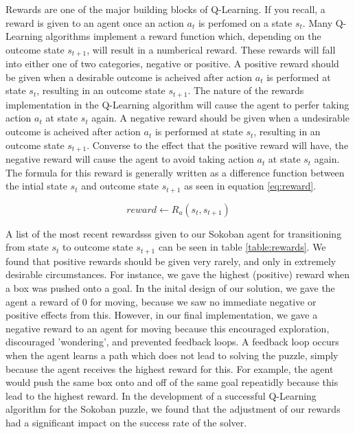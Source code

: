 \documentclass[times, 10pt,twocolumn]{article}
\begin{document}

Rewards are one of the major building blocks of Q-Learning.  If you recall, a reward is given to an agent once an action $a_t$ is perfomed on a state $s_t$.  Many Q-Learning algorithms implement a reward function which, depending on the outcome state $s_{t+1}$, will result in a numberical reward.  These rewards will fall into either one of two categories, negative or positive.  A positive reward should be given when a desirable outcome is acheived after action $a_t$ is performed at state $s_t$, resulting in an outcome state $s_{t+1}$.  The nature of the rewards implementation in the Q-Learning algorithm will cause the agent to perfer taking action $a_t$ at state $s_t$ again.  A negative reward should be given when a undesirable outcome is acheived after action $a_t$ is performed at state $s_t$, resulting in an outcome state $s_{t+1}$.  Converse to the effect that the positive reward will have, the negative reward will cause the agent to avoid taking action $a_t$ at state $s_t$ again.  The formula for this reward is generally written as a difference function between the intial state $s_t$ and outcome state $s_{t+1}$ as seen in equation \ref{eq:reward}.

\begin{equation}
reward \gets R_a(s_t, s_{t+1})
\label{eq:reward}
\end{equation}

A list of the most recent rewardsss given to our Sokoban agent for transitioning from state $s_t$ to outcome state $s_{t+1}$ can be seen in table \ref{table:rewards}.  We found that positive rewards should be given very rarely, and only in extremely desirable circumstances.  For instance, we gave the highest (positive) reward when a box was pushed onto a goal.  In the inital design of our solution, we gave the agent a reward of 0 for moving, because we saw no immediate negative or positive effects from this.  However, in our final implementation, we gave a negative reward to an agent for moving because this encouraged exploration, discouraged 'wondering', and prevented feedback loops.  A feedback loop occurs when the agent learns a path which does not lead to solving the puzzle, simply because the agent receives the highest reward for this.  For example, the agent would push the same box onto and off of the same goal repeatidly because this lead to the highest reward.  In the development of a successful Q-Learning algorithm for the Sokoban puzzle, we found that the adjustment of our rewards had a significant impact on the success rate of the solver.
\end{document}
